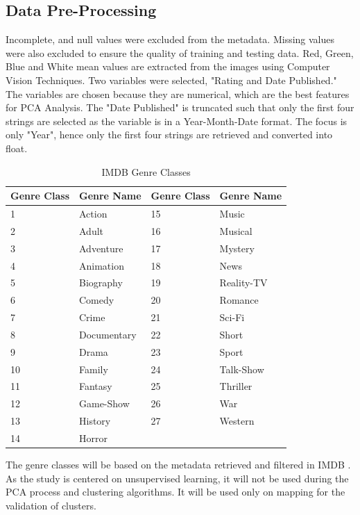 \documentclass[conference]{IEEEtran}
\begin{document}
\subsection{Data Pre-Processing}
Incomplete, and null values were excluded from the metadata. Missing values were also excluded to ensure the quality of training and testing data. Red, Green, Blue and White mean values are extracted from the images using Computer Vision Techniques. Two variables were selected, "Rating and Date Published." The variables are chosen because they are numerical, which are the best features for PCA Analysis. The "Date Published" is truncated such that only the first four strings are selected as the variable is in a Year-Month-Date format. The focus is only "Year", hence only the first four strings are retrieved and converted into float.   

\begin{table}[h]
    \renewcommand{\arraystretch}{1.2}
    \centering
    \caption{IMDB Genre Classes}
    \label{tab:imdb_genres}
    \begin{tabular}{ll|ll}
        \hline
        \textbf{Genre Class} & \textbf{Genre Name} & \textbf{Genre Class} & \textbf{Genre Name} \\
        \hline
        1  & Action      & 15 & Music \\
        2  & Adult       & 16 & Musical \\
        3  & Adventure   & 17 & Mystery \\
        4  & Animation   & 18 & News \\
        5  & Biography   & 19 & Reality-TV \\
        6  & Comedy      & 20 & Romance \\
        7  & Crime       & 21 & Sci-Fi \\
        8  & Documentary & 22 & Short \\
        9  & Drama       & 23 & Sport \\
        10 & Family      & 24 & Talk-Show \\
        11 & Fantasy     & 25 & Thriller \\
        12 & Game-Show   & 26 & War \\
        13 & History     & 27 & Western \\
        14 & Horror      &    &  \\
        \hline
    \end{tabular}
\end{table}


The genre classes will be based on the metadata retrieved and filtered in IMDB \cite{b8}. As the study is centered on unsupervised learning, it will not be used during the PCA process and clustering algorithms. It will be used only on mapping for the validation of clusters.
\end{document}
